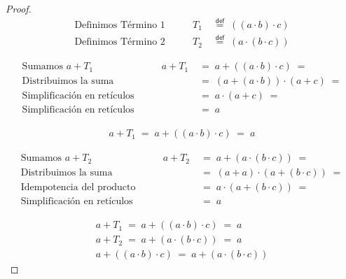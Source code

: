 \documentclass[final,12pt,a4paper,twoside,fleqn]{extbook}
\newcommand{\mathdef}{\ensuremath{\stackrel{\mathsf{def}}{{}={}}}}
\theoremstyle{definition}
\theoremstyle{remark}
\begin{document}
\begin{proof}

\begin{align}
\text{Definimos Término 1}\qquad& T_1 \;&\mathdef\; \left( \left( a \cdot b \right) \cdot c \right) \\
\text{Definimos Término 2}\qquad& T_2 \;&\mathdef\; \left( a \cdot \left( b \cdot c \right) \right)
\end{align}

\begin{align}
\text{Sumamos \(a + T_1\)}\qquad& a + T_1 \;&=\; a + \left( \left( a \cdot b \right) \cdot c \right) \;=\\
\text{Distribuimos la suma}\qquad&{}&=\; \left( a + \left( a \cdot b \right) \right) \cdot \left( a + c \right) \;=\\
\text{Simplificación en retículos}\qquad&{}&=\; a \cdot \left( a + c \right) \;=\\
\text{Simplificación en retículos}\qquad&{}&=\; a \;
\end{align}

\begin{align}
a + T_1 \;=\; a + \left( \left( a \cdot b \right) \cdot c \right) \;=\; a
\end{align}

\begin{align}
\text{Sumamos \(a + T_2\)}\qquad& a + T_2 \;&=\; a + \left( a \cdot \left( b  \cdot c \right) \right) \;=\\
\text{Distribuimos la suma}\qquad&{}&=\; \left( a + a \right) \cdot \left( a + \left( b \cdot c \right) \right) \;=\\
\text{Idempotencia del producto}\qquad&{}&=\; a \cdot \left( a + \left( b \cdot c \right) \right) \;=\\
\text{Simplificación en retículos}\qquad&{}&=\; a \;
\end{align}

\begin{align}
a + T_1 \;=\; a + \left( \left( a \cdot b \right) \cdot c \right) \;=\; a\\
a + T_2 \;=\; a + \left( a \cdot \left( b \cdot c \right) \right) \;=\; a\\
a + \left( \left( a \cdot b \right) \cdot c \right) \;=\; a + \left( a \cdot \left( b \cdot c \right) \right) 
\end{align}

\end{proof}
\end{document}
